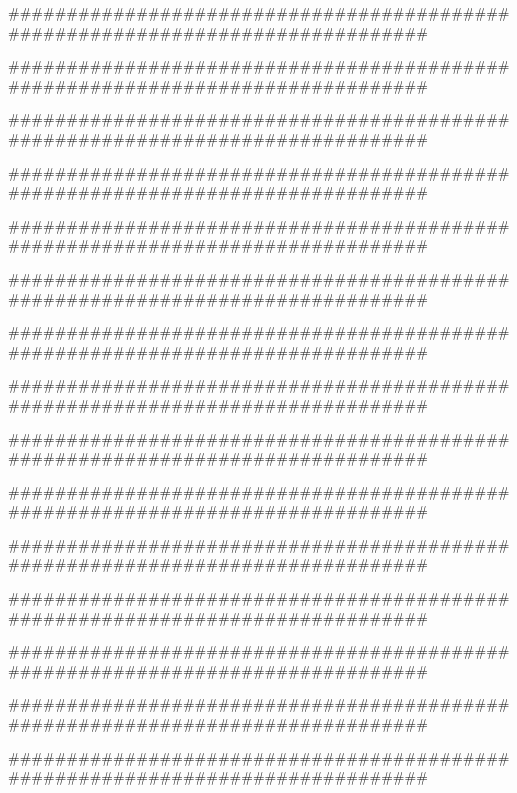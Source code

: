 ###############################################################################

###############################################################################

###############################################################################

###############################################################################

###############################################################################

###############################################################################

###############################################################################

###############################################################################

###############################################################################

###############################################################################

###############################################################################

###############################################################################

###############################################################################

###############################################################################

###############################################################################
